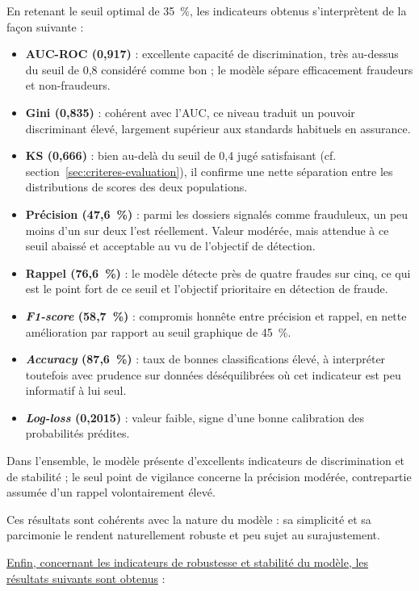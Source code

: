En retenant le seuil optimal de 35~\%, les indicateurs obtenus s'interprètent de la façon suivante :

\begin{itemize}[label = $\bullet$]
    \item \textbf{AUC-ROC (0,917)} : excellente capacité de discrimination, très au-dessus du seuil de 0,8 considéré comme bon ; le modèle sépare efficacement fraudeurs et non-fraudeurs.
    \item \textbf{Gini (0,835)} : cohérent avec l'AUC, ce niveau traduit un pouvoir discriminant élevé, largement supérieur aux standards habituels en assurance.
    \item \textbf{KS (0,666)} : bien au-delà du seuil de 0,4 jugé satisfaisant (cf. section~\ref{sec:criteres-evaluation}), il confirme une nette séparation entre les distributions de scores des deux populations.
    \item \textbf{Précision (47,6~\%)} : parmi les dossiers signalés comme frauduleux, un peu moins d'un sur deux l'est réellement. Valeur modérée, mais attendue à ce seuil abaissé et acceptable au vu de l'objectif de détection.
    \item \textbf{Rappel (76,6~\%)} : le modèle détecte près de quatre fraudes sur cinq, ce qui est le point fort de ce seuil et l'objectif prioritaire en détection de fraude.
    \item \textbf{\textit{F1-score} (58,7~\%)} : compromis honnête entre précision et rappel, en nette amélioration par rapport au seuil graphique de 45~\%.
    \item \textbf{\textit{Accuracy} (87,6~\%)} : taux de bonnes classifications élevé, à interpréter toutefois avec prudence sur données déséquilibrées où cet indicateur est peu informatif à lui seul.
    \item \textbf{\textit{Log-loss} (0,2015)} : valeur faible, signe d'une bonne calibration des probabilités prédites.
\end{itemize}

Dans l'ensemble, le modèle présente d'excellents indicateurs de discrimination et de stabilité ; le seul point de vigilance concerne la précision modérée, contrepartie assumée d'un rappel volontairement élevé.

Ces résultats sont cohérents avec la nature du modèle : sa simplicité et sa parcimonie le rendent naturellement robuste et peu sujet au surajustement.

\underline{Enfin, concernant les indicateurs de robustesse et stabilité du modèle, les résultats suivants sont obtenus} :

